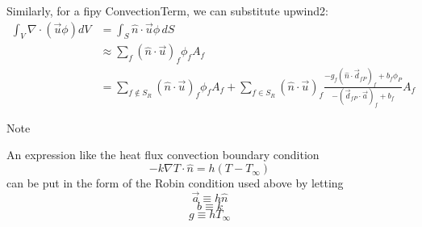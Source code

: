 \documentclass{article}
\begin{document}
Similarly, for a fipy ConvectionTerm, we can substitute upwind2:
\begin{equation*}
\begin{aligned}
\int_V \nabla\cdot\left(\vec{u}\phi\right) dV
&= \int_S \hat{n}\cdot\vec{u} \phi\,dS \\
&\approx \sum_f \left(\hat{n}\cdot\vec{u}\right)_f \phi_f A_f \\
&= \sum_{f \notin S_R} \left(\hat{n}\cdot\vec{u}\right)_f \phi_f A_f
+ \sum_{f \in S_R} \left(\hat{n}\cdot\vec{u}\right)_f
     \frac{-g_f \left(\hat{n}\cdot\vec{d}_{fP}\right)_f + b_f\phi_P}
          {- \left(\vec{d}_{fP}\cdot\vec{a}\right)_f + b_f} A_f
\end{aligned}
\end{equation*}

Note

An expression like the heat flux convection boundary condition
\begin{equation*}
-k\nabla T\cdot\hat{n} = h(T - T_\infty)
\end{equation*}
can be put in the form of the Robin condition used above by letting
\begin{equation*}
\vec{a} \equiv h \hat{n}
\end{equation*}
\begin{equation*}
b \equiv k
\end{equation*}
\begin{equation*}
g \equiv h T_\infty
\end{equation*}
\end{document}
